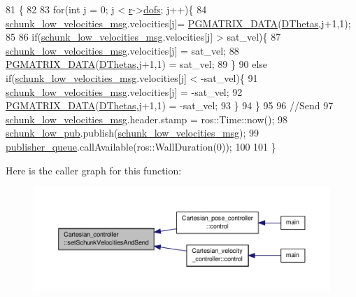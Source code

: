 \begin{DoxyCode}
81                                                                    \{
82 
83         \textcolor{keywordflow}{for}(\textcolor{keywordtype}{int} j = 0; j < \hyperlink{classCartesian__controller_a5562129951bd802e4ded77fc716c87a0}{r}->\hyperlink{structRobot_a51d4a86ac5314a1ed8614d5664c80747}{dofs}; j++)\{
84                 \hyperlink{classCartesian__controller_af59178c57bdd73d9eb474577247bbe40}{schunk\_low\_velocities\_msg}.velocities[j]=
      \hyperlink{gmatrix_8h_a7333180c47234295df2bd7b09ac00da8}{PGMATRIX\_DATA}(\hyperlink{classCartesian__controller_a5d6419e62e130150edfcbd82b1dadcae}{DThetas},j+1,1);
85 
86                 \textcolor{keywordflow}{if}(\hyperlink{classCartesian__controller_af59178c57bdd73d9eb474577247bbe40}{schunk\_low\_velocities\_msg}.velocities[j] > sat\_vel)\{
87                         \hyperlink{classCartesian__controller_af59178c57bdd73d9eb474577247bbe40}{schunk\_low\_velocities\_msg}.velocities[j] = sat\_vel;
88                         \hyperlink{gmatrix_8h_a7333180c47234295df2bd7b09ac00da8}{PGMATRIX\_DATA}(\hyperlink{classCartesian__controller_a5d6419e62e130150edfcbd82b1dadcae}{DThetas},j+1,1) = sat\_vel;
89                 \}
90                 \textcolor{keywordflow}{else} \textcolor{keywordflow}{if}(\hyperlink{classCartesian__controller_af59178c57bdd73d9eb474577247bbe40}{schunk\_low\_velocities\_msg}.velocities[j] < -sat\_vel)\{
91                         \hyperlink{classCartesian__controller_af59178c57bdd73d9eb474577247bbe40}{schunk\_low\_velocities\_msg}.velocities[j] = -sat\_vel;
92                         \hyperlink{gmatrix_8h_a7333180c47234295df2bd7b09ac00da8}{PGMATRIX\_DATA}(\hyperlink{classCartesian__controller_a5d6419e62e130150edfcbd82b1dadcae}{DThetas},j+1,1) = -sat\_vel;
93                 \}
94         \}
95 
96         \textcolor{comment}{//Send}
97         \hyperlink{classCartesian__controller_af59178c57bdd73d9eb474577247bbe40}{schunk\_low\_velocities\_msg}.header.stamp = ros::Time::now();
98         \hyperlink{classCartesian__controller_aa6ce9cffdd307127ed814d6e5132eba2}{schunk\_low\_pub}.publish(\hyperlink{classCartesian__controller_af59178c57bdd73d9eb474577247bbe40}{schunk\_low\_velocities\_msg});
99         \hyperlink{classCartesian__controller_a041a2eb6657c9b036a512fb21e9f5086}{publisher\_queue}.callAvailable(ros::WallDuration(0));
100 
101 \}
\end{DoxyCode}


Here is the caller graph for this function\-:\nopagebreak
\begin{figure}[H]
\begin{center}
\leavevmode
\includegraphics[width=350pt]{classCartesian__controller_a40d17a9794af8a9a607618bf0ee5efff_icgraph}
\end{center}
\end{figure}



